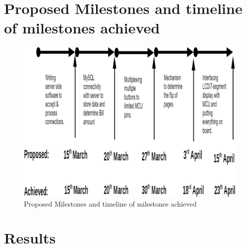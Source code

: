 \documentclass[12pt,a4paper]{article}
\begin{document}
	    \section{Proposed Milestones and timeline of milestones achieved}
   		\begin{figure}[h]
			\centering
			\caption{Proposed Milestones and timeline of milestones achieved}
			\includegraphics[scale=.45]{timeline}
		\end{figure}

		\newpage
	    \section{Results}
\end{document}
